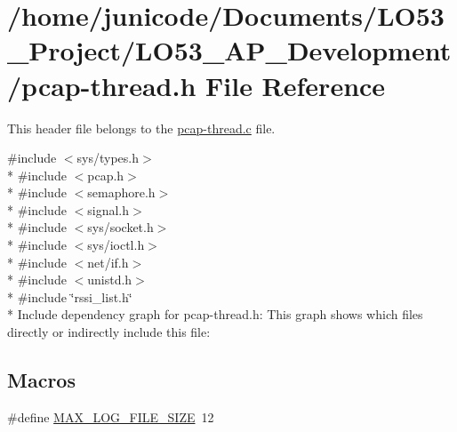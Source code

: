 \hypertarget{pcap-thread_8h}{}\section{/home/junicode/\+Documents/\+L\+O53\+\_\+\+Project/\+L\+O53\+\_\+\+A\+P\+\_\+\+Development/pcap-\/thread.h File Reference}
\label{pcap-thread_8h}


This header file belongs to the \hyperlink{pcap-thread_8c}{pcap-\/thread.\+c} file.  


{\ttfamily \#include $<$sys/types.\+h$>$}\\*
{\ttfamily \#include $<$pcap.\+h$>$}\\*
{\ttfamily \#include $<$semaphore.\+h$>$}\\*
{\ttfamily \#include $<$signal.\+h$>$}\\*
{\ttfamily \#include $<$sys/socket.\+h$>$}\\*
{\ttfamily \#include $<$sys/ioctl.\+h$>$}\\*
{\ttfamily \#include $<$net/if.\+h$>$}\\*
{\ttfamily \#include $<$unistd.\+h$>$}\\*
{\ttfamily \#include \char`\"{}rssi\+\_\+list.\+h\char`\"{}}\\*
Include dependency graph for pcap-\/thread.h\+:
This graph shows which files directly or indirectly include this file\+:
\subsection*{Macros}
\begin{DoxyCompactItemize}
\item 
\#define \hyperlink{pcap-thread_8h_afd932992b0afe0ee3014a55ceace90c7}{M\+A\+X\+\_\+\+L\+O\+G\+\_\+\+F\+I\+L\+E\+\_\+\+S\+I\+Z\+E}~12
\end{DoxyCompactItemize}
